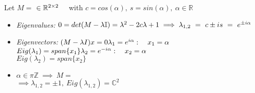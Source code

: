 \begin{SolutionSheet}[\ref{sheet1}]
\begin{onehalfspace}
  \begin{Solution}
    Let $M=$ $ \in \mathbb{R}^{2\times 2} \quad$ with $c = cos(\alpha), \ s = sin(\alpha), \ \alpha \in \mathbb{R}$ \\
    \begin{itemize}
      \item \textit{Eigenvalues:} $0 = det(M-\lambda \mathbb{I}) = \lambda^2 - 2c\lambda + 1 \\
        \implies \lambda_{1,2} \ = \ c \pm is \ = \ e^{\pm i\alpha}$ \\
      \item \textit{Eigenvectors:} $(M-\lambda I)x = 0 \\
        \lambda_1 = e^{i\alpha}: \quad x_1 = \alpha $  \\
        $Eig(\lambda_1) = span\{x_1\} \\
        \lambda_2 = e^{-i\alpha}: \quad x_2 = \alpha $ \\
        $Eig(\lambda_2) = span\{x_2\}$
      \item $\alpha \in \pi \mathbb{Z} \ \implies \ M=$  \\
        $\implies \lambda_{1,2} = \pm 1, \ Eig(\lambda_{1,2}) = \mathbb{C}^2$
    \end{itemize}
  \end{Solution}

  \begin{Solution}[Programming]
  \end{Solution}

\end{onehalfspace}
\end{SolutionSheet}


